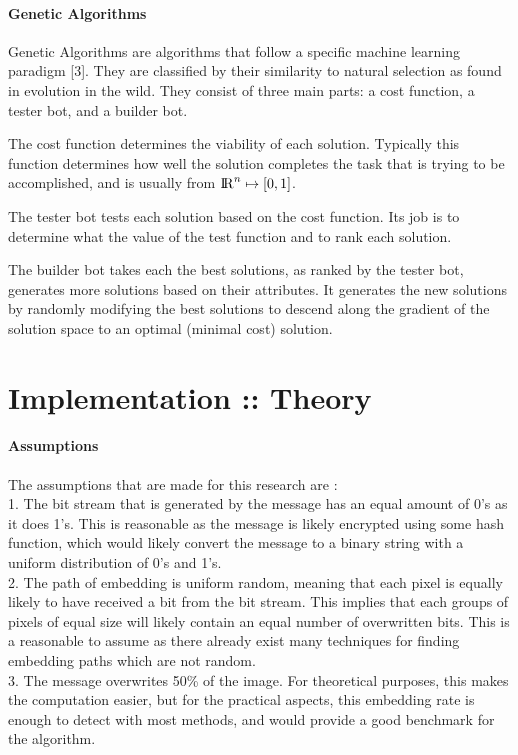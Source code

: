 \documentclass[12pt]{article}
\begin{document}
\paragraph{Genetic Algorithms}
\par Genetic Algorithms are algorithms that follow a specific machine learning paradigm [3]. They are classified by their similarity to natural selection as found in evolution in the wild. They consist of three main parts: a cost function, a tester bot, and a builder bot.
\par The cost function determines the viability of each solution. Typically this function determines how well the solution completes the task that is trying to be accomplished, and is usually from ${\rm I\!R}^n \mapsto [0, 1]$. 
\par The tester bot tests each solution based on the cost function. Its job is to determine what the value of the test function and to rank each solution.
\par The builder bot takes each the best solutions, as ranked by the tester bot, generates more solutions based on their attributes. It generates the new solutions by randomly modifying the best solutions to descend along the gradient of the solution space to an optimal (minimal cost) solution.

\section{Implementation :: Theory}
\paragraph{Assumptions}
\par The assumptions that are made for this research are :
\\ 1. The bit stream that is generated by the message has an equal amount of 0's as it does 1's. This is reasonable as the message is likely encrypted using some hash function, which would likely convert the message to a binary string with a uniform distribution of 0's and 1's.
\\ 2. The path of embedding is uniform random, meaning that each pixel is equally likely to have received a bit from the bit stream. This implies that each groups of pixels of equal size will likely contain an equal number of overwritten bits. This is a reasonable to assume as there already exist many techniques for finding embedding paths which are not random. 
\\ 3. The message overwrites 50\% of the image. For theoretical purposes, this makes the computation easier, but for the practical aspects, this embedding rate is enough to detect with most methods, and would provide a good benchmark for the algorithm.
 
\end{document}
